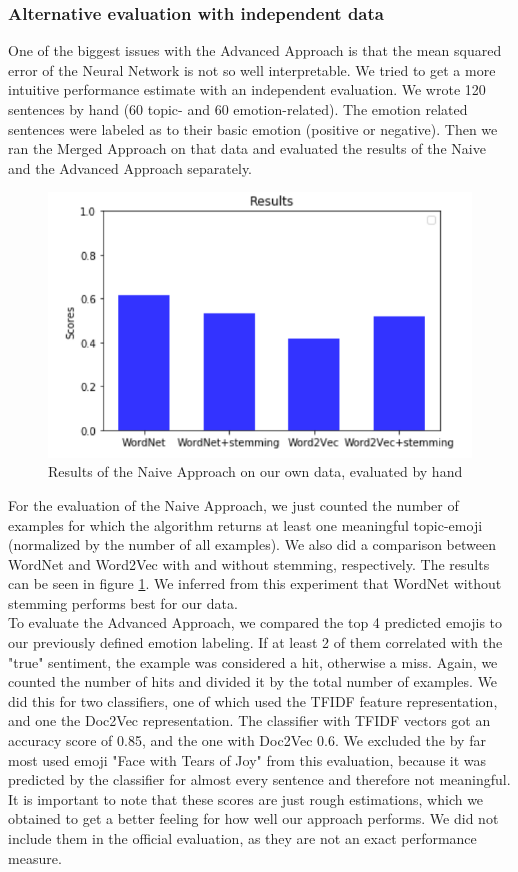 \documentclass{article}
\begin{document}
\subsubsection{Alternative evaluation with independent data}
\label{sec:alternative_eval}
One of the biggest issues with the Advanced Approach is that the mean squared error of the Neural Network is not so well interpretable. We tried to get a more intuitive performance estimate with an independent evaluation. We wrote 120 sentences by hand (60 topic- and 60 emotion-related). The emotion related sentences were labeled as to their basic emotion (positive or negative). Then we ran the Merged Approach on that data and evaluated the results of the Naive and the Advanced Approach separately.
\begin{figure}[h!]
\centering
\includegraphics[scale=0.45]{images/naiveApproachEval.png}
\caption{Results of the Naive Approach on our own data, evaluated by hand}
\label{fig:naiveApproachEval}
\end{figure}
For the evaluation of the Naive Approach, we just counted the number of examples for which the algorithm returns at least one meaningful topic-emoji (normalized by the number of all examples). We also did a comparison between WordNet and Word2Vec with and without stemming, respectively. The results can be seen in figure \ref{fig:naiveApproachEval}. We inferred from this experiment that WordNet without stemming performs best for our data.\\
To evaluate the Advanced Approach, we compared the top 4 predicted emojis to our previously defined emotion labeling. If at least 2 of them correlated with the "true" sentiment, the example was considered a hit, otherwise a miss. Again, we counted the number of hits and divided it by the total number of examples. We did this for two classifiers, one of which used the TFIDF feature representation, and one the Doc2Vec representation. The classifier with TFIDF vectors got an accuracy score of 0.85, and the one with Doc2Vec 0.6. We excluded the by far most used emoji "Face with Tears of Joy" from this evaluation, because it was predicted by the classifier for almost every sentence and therefore not meaningful.\\
It is important to note that these scores are just rough estimations, which we obtained to get a better feeling for how well our approach performs. We did not include them in the official evaluation, as they are not an exact performance measure.
\end{document}
